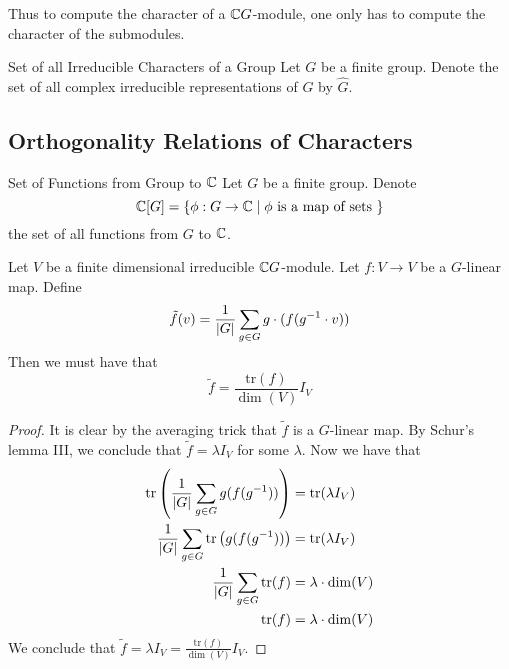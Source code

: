 \documentclass[a4paper]{article}
\begin{document}
Thus to compute the character of a $\mathbb{C} G$-module, one only has to compute the character of the submodules. 

\begin{defn}{Set of all Irreducible Characters of a Group}{} Let $G$ be a finite group. Denote the set of all complex irreducible representations of $G$ by $\hat{G}$. 
\end{defn}

\subsection{Orthogonality Relations of Characters}
\begin{defn}{Set of Functions from Group to $\mathbb{C}$}{} Let $G$ be a finite group. Denote $$\mathbb{C}[G]=\{\phi:G\to\mathbb{C}\;|\;\phi\text{ is a map of sets }\}$$ the set of all functions from $G$ to $\mathbb{C}$. 
\end{defn}

\begin{lmm}{}{} Let $V$ be a finite dimensional irreducible $\mathbb{C} G$-module. Let $f:V\to V$ be a $G$-linear map. Define $$\tilde{f}(v)=\frac{1}{\abs{G}}\sum_{g\in G}g\cdot(f(g^{-1}\cdot v))$$ Then we must have that $$\tilde{f}=\frac{\text{tr}(f)}{\dim(V)}I_V$$ \tcbline
\begin{proof}
It is clear by the averaging trick that $\tilde{f}$ is a $G$-linear map. By Schur's lemma III, we conclude that $\tilde{f}=\lambda I_V$ for some $\lambda$. Now we have that 
\begin{align*}
\text{tr}\left(\frac{1}{\abs{G}}\sum_{g\in G}g(f(g^{-1}))\right)&=\text{tr}(\lambda I_V)\\
\frac{1}{\abs{G}}\sum_{g\in G}\text{tr}\left(g(f(g^{-1}))\right)&=\text{tr}(\lambda I_V)\\
\frac{1}{\abs{G}}\sum_{g\in G}\text{tr}(f)&=\lambda\cdot\dim(V)\\
\text{tr}(f)&=\lambda\cdot\dim(V)
\end{align*}
We conclude that $\tilde{f}=\lambda I_V=\frac{\text{tr}(f)}{\dim(V)}I_V$. 
\end{proof}
\end{lmm}
\end{document}
